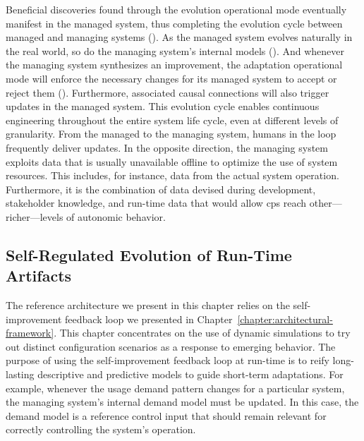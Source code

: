 Beneficial discoveries found through the evolution operational mode eventually manifest in the managed system, thus completing the evolution cycle between managed and managing systems (). %
As the managed system evolves naturally in the real world, so do the managing system's internal models (). And whenever the managing system synthesizes an improvement, the adaptation operational mode will enforce the necessary changes for its managed system to accept or reject them (). Furthermore, associated causal connections will also trigger updates in the managed system. This evolution cycle enables continuous engineering throughout the entire system life cycle, even at different levels of granularity. From the managed to the managing system, humans in the loop frequently deliver updates. In the opposite direction, the managing system exploits data that is usually unavailable offline to optimize the use of system resources. This includes, for instance, data from the actual system operation. Furthermore, it is the combination of data devised during development, stakeholder knowledge, and run-time data that would allow \gls{cps} reach other---richer---levels of autonomic behavior.

\subsection{Self-Regulated Evolution of Run-Time Artifacts}
\label{subsect:reference-architecture--self-regulated-evolution-of-run-time-artifacts}

The reference architecture we present in this chapter relies on the self-improvement feedback loop we presented in Chapter~\ref{chapter:architectural-framework}. This chapter concentrates on the use of dynamic simulations to try out distinct configuration scenarios as a response to emerging behavior. The purpose of using the self-improvement feedback loop at run-time is to reify long-lasting descriptive and predictive models to guide short-term adaptations. For example, whenever the usage demand pattern changes for a particular system, the managing system's internal demand model must be updated. In this case, the demand model is a reference control input that should remain relevant for correctly controlling the system's operation.

